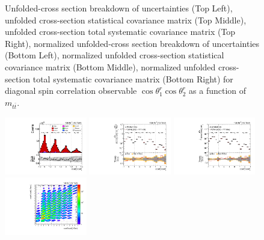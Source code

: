 \begin{figure}[htb]
\begin{center}
\caption{Unfolded-cross section breakdown of uncertainties (Top Left), unfolded cross-section statistical covariance matrix (Top Middle), unfolded cross-section total systematic covariance matrix (Top Right), normalized unfolded-cross section breakdown of uncertainties (Bottom Left), normalized unfolded cross-section statistical covariance matrix (Bottom Middle), normalized unfolded cross-section total systematic covariance matrix (Bottom Right) for diagonal spin correlation observable $\cos\theta_{1}^{r}\cos\theta_{2}^{r}$ as a function of $m_{t\bar{t}}$.}
\label{fig:c_rr_mttbar_uncertainties}
\end{center}
\end{figure}
\clearpage
\begin{figure}[htb]
\begin{center}
 \includegraphics[width=0.32\textwidth]{fig_fullRun2UL/controlplots/combined/Hyp_LLBarCnn_vs_TTBarMass.pdf}
 \includegraphics[width=0.32\textwidth]{fig_fullRun2UL/unfolding/combined/UnfoldedResults_c_nn_mttbar.pdf}
 \includegraphics[width=0.32\textwidth]{fig_fullRun2UL/unfolding/combined/UnfoldedResultsNorm_c_nn_mttbar.pdf} \\
 \includegraphics[width=0.32\textwidth]{fig_fullRun2UL/unfolding/combined/ResponseMatrix_c_nn_mttbar.pdf}

\end{center}
\end{figure}
